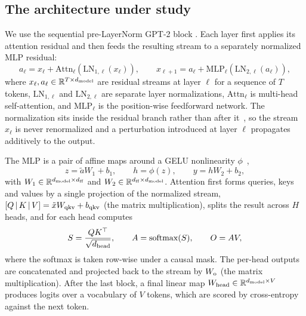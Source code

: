 \subsection{The architecture under study}

We use the sequential pre-LayerNorm GPT-2 block
\citep{radford2019language,vaswani2017attention}. Each layer first applies its
attention residual and then feeds the resulting stream to a separately
normalized MLP residual:
\begin{equation*}
  a_\ell = x_\ell + \mathrm{Attn}_\ell(\mathrm{LN}_{1,\ell}(x_\ell)),
  \qquad
  x_{\ell+1} = a_\ell + \mathrm{MLP}_\ell(\mathrm{LN}_{2,\ell}(a_\ell)),
\end{equation*}
where $x_\ell,a_\ell \in \mathbb{R}^{T \times d_{\rm model}}$ are residual streams at
layer $\ell$ for a sequence of $T$ tokens, $\mathrm{LN}_{1,\ell}$ and
$\mathrm{LN}_{2,\ell}$ are separate layer normalizations,
$\mathrm{Attn}_\ell$ is multi-head self-attention, and $\mathrm{MLP}_\ell$ is
the position-wise feedforward network. The normalization sits inside the
residual branch rather than after it~\citep{xiong2020layer}, so the stream
$x_\ell$ is never renormalized and a perturbation introduced at layer $\ell$
propagates additively to the output.

The MLP is a pair of affine maps around a GELU
nonlinearity $\phi$~\citep{hendrycks2016gelu},
\begin{equation}
  z = \widetilde a W_1 + b_1, \qquad h = \phi(z), \qquad y = h W_2 + b_2,
  \label{eq:mlp}
\end{equation}
with $W_1 \in \mathbb{R}^{d_{\rm model} \times d_{\rm ff}}$ and
$W_2 \in \mathbb{R}^{d_{\rm ff} \times d_{\rm model}}$. Attention first forms queries,
keys and values by a single projection of the normalized stream,
$[Q\,|\,K\,|\,V] = \tilde{x} W_{\rm qkv} + b_{\rm qkv}$ (the 
matrix multiplication), splits the result across $H$ heads, and for each head
computes
\begin{equation*}
  S = \frac{QK^\top}{\sqrt{d_{\rm head}}}, \qquad
  A = \operatorname{softmax}(S), \qquad
  O = AV,
\end{equation*}
where the softmax is taken row-wise under a causal mask. The per-head outputs
are concatenated and projected back to the stream by $W_{\rm o}$ (the
 matrix multiplication). After the last block, a final linear map
$W_{\rm head} \in \mathbb{R}^{d_{\rm model} \times V}$ produces logits over a
vocabulary of $V$ tokens, which are scored by cross-entropy against the next
token.


